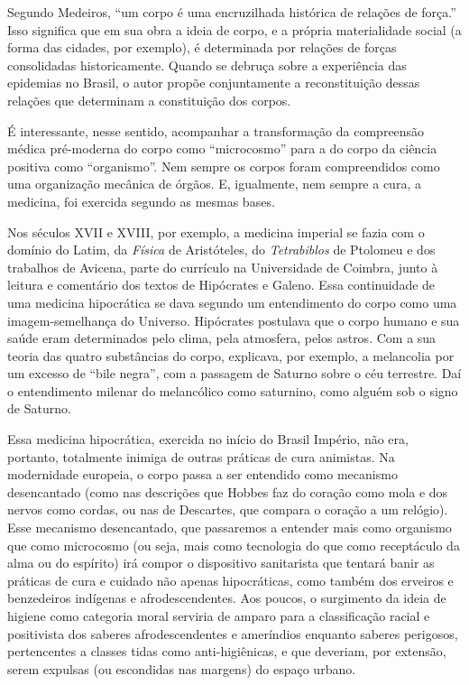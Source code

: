 Segundo Medeiros, ``um corpo é uma encruzilhada histórica de relações de
força.'' Isso significa que em sua obra a ideia de corpo, e a própria
materialidade social (a forma das cidades, por exemplo), é determinada
por relações de forças consolidadas historicamente. Quando se debruça
sobre a experiência das epidemias no Brasil, o autor propõe
conjuntamente a reconstituição dessas relações que determinam a
constituição dos corpos.

É interessante, nesse sentido, acompanhar a transformação da compreensão
médica pré-moderna do corpo como ``microcosmo'' para a do corpo da
ciência positiva como ``organismo''. Nem sempre os corpos foram
compreendidos como uma organização mecânica de órgãos. E, igualmente,
nem sempre a cura, a medicina, foi exercida segundo as mesmas bases.

Nos séculos XVII e XVIII, por exemplo, a medicina imperial se fazia com
o domínio do Latim, da \emph{Física} de Aristóteles, do
\emph{Tetrabiblos} de Ptolomeu e dos trabalhos de Avicena, parte do
currículo na Universidade de Coimbra, junto à leitura e comentário dos
textos de Hipócrates e Galeno. Essa continuidade de uma medicina
hipocrática se dava segundo um entendimento do corpo como uma
imagem-semelhança do Universo. Hipócrates postulava que o corpo humano e
sua saúde eram determinados pelo clima, pela atmosfera, pelos astros.
Com a sua teoria das quatro substâncias do corpo, explicava, por
exemplo, a melancolia por um excesso de ``bile negra'', com a passagem
de Saturno sobre o céu terrestre. Daí o entendimento milenar do
melancólico como saturnino, como alguém sob o signo de Saturno.

Essa medicina hipocrática, exercida no início do Brasil Império, não
era, portanto, totalmente inimiga de outras práticas de cura animistas.
Na modernidade europeia, o corpo passa a ser entendido como mecanismo
desencantado (como nas descrições que Hobbes faz do coração como mola e
dos nervos como cordas, ou nas de Descartes, que compara o coração a um
relógio). Esse mecanismo desencantado, que passaremos a entender mais
como organismo que como microcosmo (ou seja, mais como tecnologia do que
como receptáculo da alma ou do espírito) irá compor o dispositivo
sanitarista que tentará banir as práticas de cura e cuidado não apenas
hipocráticas, como também dos erveiros e benzedeiros indígenas e
afrodescendentes. Aos poucos, o surgimento da ideia de higiene como
categoria moral serviria de amparo para a classificação racial e
positivista dos saberes afrodescendentes e ameríndios enquanto saberes
perigosos, pertencentes a classes tidas como anti-higiênicas, e que
deveriam, por extensão, serem expulsas (ou escondidas nas margens) do
espaço urbano.

